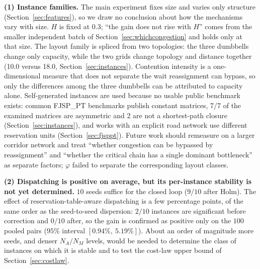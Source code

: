 \documentclass[manuscript,screen,review]{acmart}
\newcommand{\NCases}{10}
\newcommand{\NSeeds}{10}
\newcommand{\NPairs}{100}
\newcommand{\CIProbeLoop}{$[0.94\%,\ 5.19\%]$}
\newcommand{\CellsSigLoopAdj}{9}
\newcommand{\CellsSigProbe}{2}
\newcommand{\CellsSigProbeAdj}{0}
\newcommand{\LegDumbbell}{10.0}          %
\newcommand{\LegGrid}{18.0}              %
\newcommand{\PubNLayout}{7}
\newcommand{\PubNLayoutAsym}{7}           %
\newcommand{\PubNLayoutBad}{2}            %
\begin{document}
\textbf{(1) Instance families.}
The main experiment fixes size and varies only structure (Section~\ref{sec:features}), so we draw no conclusion about how the mechanisms vary with size.
$H$ is fixed at $0.3$; ``the gain does not rise with $H$'' comes from the smaller independent batch of Section~\ref{sec:whichcongestion} and holds only at that size.
The layout family is spliced from two topologies: the three dumbbells change only capacity, while the two grids change topology and distance together (\LegDumbbell{} versus \LegGrid{}, Section~\ref{sec:instances}).
Contention intensity is a one-dimensional measure that does not separate the wait reassignment can bypass, so only the differences among the three dumbbells can be attributed to capacity alone.
Self-generated instances are used because no usable public benchmark exists: common FJSP\_PT benchmarks publish constant matrices, \PubNLayoutAsym{}/\PubNLayout{} of the examined matrices are asymmetric and \PubNLayoutBad{} are not a shortest-path closure (Section~\ref{sec:instances}), and works with an explicit road network use different reservation units (Section~\ref{sec:fjsppt}).
Future work should remeasure on a larger corridor network and treat ``whether congestion can be bypassed by reassignment'' and ``whether the critical chain has a single dominant bottleneck'' as separate factors; $\varphi$ failed to separate the corresponding layout classes.

\textbf{(2) Dispatching is positive on average, but its per-instance stability is not yet determined.}
$\NSeeds$ seeds suffice for the closed loop ($\CellsSigLoopAdj/\NCases$ after Holm).
The effect of reservation-table-aware dispatching is a few percentage points, of the same order as the seed-to-seed dispersion: $\CellsSigProbe/\NCases$ instances are significant before correction and $\CellsSigProbeAdj/\NCases$ after, so the gain is confirmed as positive only on the $\NPairs$ pooled pairs ($95\%$ interval \CIProbeLoop{}).
About an order of magnitude more seeds, and denser $N_A/N_M$ levels, would be needed to determine the class of instances on which it is stable and to test the cost-law upper bound of Section~\ref{sec:costlaw}.
\end{document}
